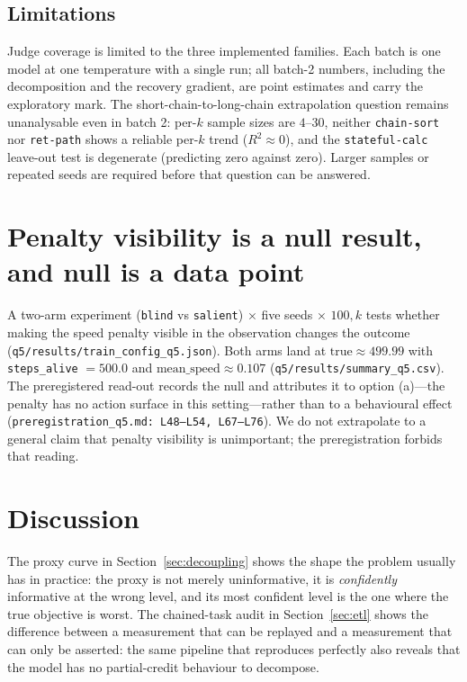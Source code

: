 \documentclass[11pt]{article}
\begin{document}
\subsection{Limitations}

Judge coverage is limited to the three implemented families. Each batch is
one model at one temperature with a single run; all batch-2 numbers,
including the decomposition and the recovery gradient, are point estimates
and carry the exploratory mark. The short-chain-to-long-chain extrapolation
question remains unanalysable even in batch 2: per-$k$ sample sizes are
$4$--$30$, neither \texttt{chain-sort} nor \texttt{ret-path} shows a
reliable per-$k$ trend ($R^2 \approx 0$), and the \texttt{stateful-calc}
leave-out test is degenerate (predicting zero against zero). Larger samples
or repeated seeds are required before that question can be answered.

\section{Penalty visibility is a null result, and null is a data point}
\label{sec:q5}

A two-arm experiment (\texttt{blind} vs \texttt{salient}) $\times$ five seeds
$\times$ $100{,}k$ tests whether making the speed penalty visible in the
observation changes the outcome (\texttt{q5/results/train\_config\_q5.json}).
Both arms land at $\mathrm{true} \approx 499.99$ with
\texttt{steps\_alive} $= 500.0$ and $\mathrm{mean\_speed} \approx 0.107$
(\texttt{q5/results/summary\_q5.csv}). The preregistered read-out records the
null and attributes it to option (a)---the penalty has no action surface in
this setting---rather than to a behavioural effect
(\texttt{preregistration\_q5.md:\,L48--L54, L67--L76}). We do not extrapolate
to a general claim that penalty visibility is unimportant; the preregistration
forbids that reading.

\section{Discussion}
\label{sec:disc}

The proxy curve in Section~\ref{sec:decoupling} shows the shape the problem
usually has in practice: the proxy is not merely uninformative, it is
\emph{confidently} informative at the wrong level, and its most confident
level is the one where the true objective is worst. The chained-task audit in
Section~\ref{sec:etl} shows the difference between a measurement that can be
replayed and a measurement that can only be asserted: the same pipeline that
reproduces perfectly also reveals that the model has no partial-credit
behaviour to decompose.
\end{document}

